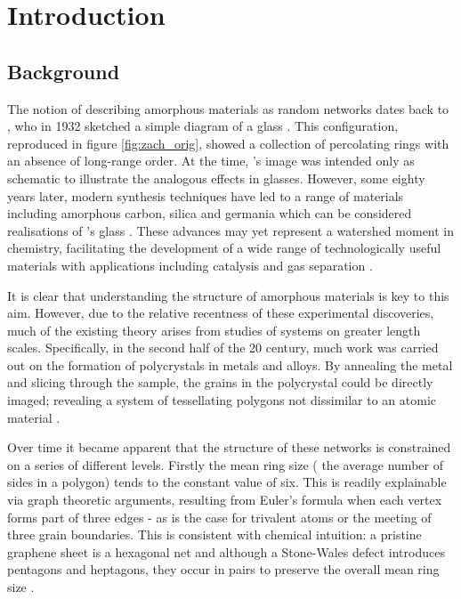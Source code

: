 \chapter{Introduction}
\label{ch:intro}

\section{Background}
\label{s:background}

The notion of describing amorphous materials as random networks dates back to \zach, who in 1932 sketched a simple diagram of a \td{} glass \cite{Zachariasen1932}.
This configuration, reproduced in figure \ref{fig:zach_orig}, showed a collection of percolating rings with an absence of long\--range order.
At the time, \zach's image was intended only as schematic to illustrate the analogous effects in \thd{} glasses.
However, some eighty years later, modern synthesis techniques have led to a range of \td{} materials including amorphous carbon, silica and germania which can be considered realisations of \zach's glass \cite{Kotakoski2011,Robertson2012,Huang2012,Lichtenstein2012a,Shaikhutdinov2013,Lewandowski2018,Lewandowski2019}.
These advances may yet represent a watershed moment in chemistry, facilitating the development of a wide range of technologically useful materials with applications including catalysis and gas separation \cite{Trogadas2014,Sun2015a,Buchner2017}.

It is clear that understanding the structure of amorphous materials is key to this aim.
However, due to the relative recentness of these experimental discoveries, much of the existing theory arises from studies of systems on greater length scales.
Specifically, in the second half of the 20\th{} century, much work was carried out on the formation of polycrystals in metals and alloys.
By annealing the metal and slicing through the sample, the grains in the polycrystal could be directly imaged; revealing a system of tessellating polygons not dissimilar to an atomic material \cite{Beck1954,Dunn1957}.

Over time it became apparent that the structure of these networks is constrained on a series of different levels.
Firstly the mean ring size (\ie{} the average number of sides in a polygon) tends to the constant value of six.
This is readily explainable via graph theoretic arguments, resulting from Euler's formula when each vertex forms part of three edges - as is the case for trivalent atoms or the meeting of three grain boundaries.
This is consistent with chemical intuition: a pristine graphene sheet is a hexagonal net and although a Stone\--Wales defect introduces pentagons and heptagons, they occur in pairs to preserve the overall mean ring size \cite{Stone1986}.

